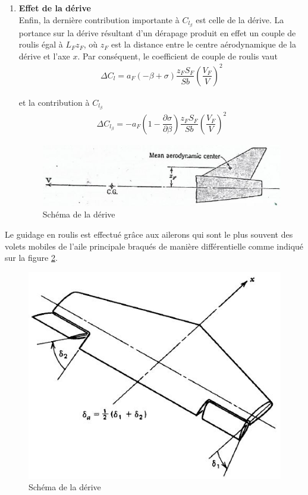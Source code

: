 \documentclass{report}
\begin{document}
\begin{enumerate}
\item \textbf{Effet de la dérive}\\

Enfin, la dernière contribution importante à $C_{l_\beta}$ est celle de la dérive. La portance sur la dérive résultant d'un dérapage produit en effet un couple de roulis égal à $L_Fz_F$, où $z_F$ est la distance entre le centre aérodynamique de la dérive et l'axe $x$. Par conséquent, le coefficient de couple de roulis vaut
\begin{eqnarray}
\Delta C_l=a_F(-\beta+\sigma)\dfrac{z_FS_F}{Sb}\left(\dfrac{V_F}{V}\right)^2
\end{eqnarray}

et la contribution à $C_{l_\beta}$
\begin{eqnarray}
\Delta C_{l_\beta}=-a_F\left(1-\dfrac{\partial\sigma}{\partial \beta}\right)\dfrac{z_FS_F}{Sb}\left(\dfrac{V_F}{V}\right)^2
\end{eqnarray}

\begin{figure}[h!]
    \centering
    \includegraphics[scale=0.6]{35.JPG}
    \caption{Schéma de la dérive}
    \label{35}
\end{figure}
\end{enumerate}

Le guidage en roulis est effectué grâce aux ailerons qui sont le plus souvent des volets mobiles de l'aile principale braqués de manière différentielle comme indiqué sur la figure \ref{36}.

\begin{figure}[h!]
    \centering
    \includegraphics[scale=0.6]{36.JPG}
    \caption{Schéma de la dérive}
    \label{36}
\end{figure}
\end{document}
